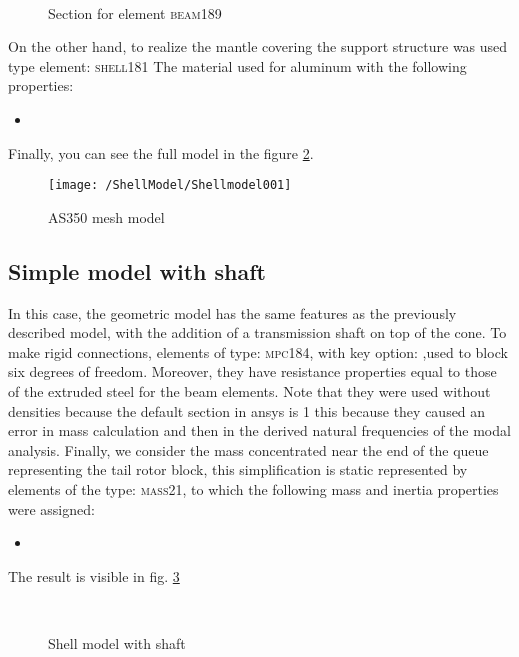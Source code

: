 \begin{figure}[htb]
\centering
{} \quad
{}\\
\caption{Section for element \textsc{beam189}}
\label{fig:SectionGeometry}
\end{figure}

\noindent On the other hand, to realize the mantle covering the support structure was used type element: \textsc{shell181}
The material used for aluminum with the following properties:
\begin{itemize}
\item
\end{itemize}
Finally, you can see the full model in the figure \ref{fig:Ansys1Mesh}.

\begin{figure}[ht]
\centering
\texttt{[image: /ShellModel/Shellmodel001]}
\caption{AS350 mesh model}
\label{fig:Ansys1Mesh}
\end{figure}

\subsection{Simple model with shaft}
In this case, the geometric model has the same features as the previously described model, with the addition of a transmission shaft on top of the cone.
To make rigid connections, elements of type: \textsc{mpc184}, with key option: ,used to block six degrees of freedom. Moreover, they have resistance properties equal to those of the extruded steel for the beam elements. 
Note that they were used without densities because the default section in ansys is 1 this because they caused an error in mass calculation and then in the derived natural frequencies of the modal analysis.
Finally, we consider the mass concentrated near the end of the queue representing the tail rotor block, this simplification is static represented by elements of the type: \textsc{mass21}, to which the following mass and inertia properties were assigned:
\begin{itemize}
\item
\end{itemize}
The result is visible in fig. \ref{fig:Ansys1MeshShaft}

\begin{figure}[ht]
\centering
{} \quad
{}\\
\caption{Shell model with shaft}
\label{fig:Ansys1MeshShaft}
\end{figure}

